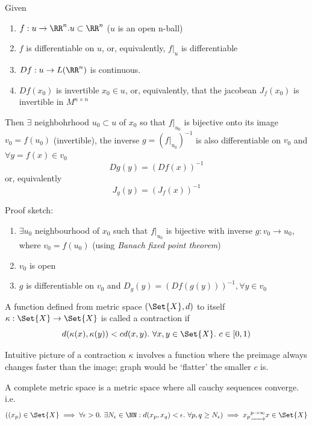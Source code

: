 \begin{thm}
  Given
  \begin{enumerate}
  \item $f: u \rightarrow \RR^n. u \subset \RR^n$ ($u$ is an open n-ball)
  \item $f$ is differentiable on $u$, or, equivalently, $f|_u$ is differentiable
  \item $Df: u \rightarrow L(\RR^n)$ is continuous.
  \item $Df(x_0)$ is invertible $x_0 \in u$, or, equivalently, that the jacobean $J_f(x_0)$ is invertible in $M^{n\times n}$
  \end{enumerate}
  Then $\exists$ neighbohrhood $u_0 \subset u$ of $x_0$ so that $f|_{u_0}$ is bijective onto its image $v_0 = f(u_0)$ (invertible), the inverse $g = (f|_{u_0})^{-1}$ is also differentiable on $v_0$ and $\forall y = f(x) \in v_0$
  $$Dg(y) = (Df(x))^{-1}$$
  or, equivalently
  $$J_g(y) = (J_f(x))^{-1}$$
\end{thm}

Proof sketch:
\begin{enumerate}[I]
\item $\exists u_0$ neighbourhood of $x_0$ such that $f|_{u_0}$ is bijective with inverse $g: v_0 \rightarrow u_0$, where $v_0 = f(u_0)$ (using \emph{Banach fixed point theorem})
\item $v_0$ is open
\item $g$ is differentiable on $v_0$ and $D_g(y) = (Df(g(y)))^{-1}, \forall y \in v_0$
\end{enumerate}

\begin{defn}
  A function defined from metric space $(\Set{X}, d)$ to itself $\kappa: \Set{X} \rightarrow \Set{X}$ is called a contraction if
  $$d(\kappa(x), \kappa(y)) < cd(x,y).\ \forall x, y \in \Set{X}.\ c \in [0, 1)$$
\end{defn}

\begin{rem}
  Intuitive picture of a contraction $\kappa$ involves  a function where the preimage always changes faster than the image; graph would be `flatter' the smaller $c$ is.
\end{rem}

\begin{ldefn}
  A complete metric space is a metric space where all cauchy sequences converge. i.e. $$((x_p) \in \Set{X} \implies \forall \epsilon > 0 . \ \exists N_\epsilon \in \NN : d(x_p, x_q) < \epsilon .\  \forall p, q \geq N_\epsilon) \implies x_p \underrightarrow{^{p\rightarrow \infty}} x \in \Set{X} $$
\end{ldefn}

